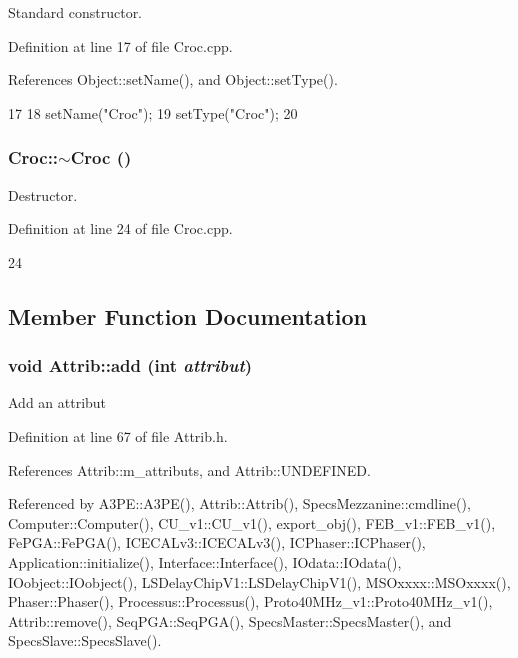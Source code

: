 Standard constructor. 

Definition at line 17 of file Croc.cpp.

References Object::setName(), and Object::setType().


\begin{DoxyCode}
17              {
18   setName("Croc");
19   setType("Croc");
20 }
\end{DoxyCode}
\hypertarget{classCroc_ace1e761410c9b53c1ff062a0dadcbd7b}{
\subsubsection[{$\sim$Croc}]{\setlength{\rightskip}{0pt plus 5cm}Croc::$\sim$Croc ()}}
\label{classCroc_ace1e761410c9b53c1ff062a0dadcbd7b}


Destructor. 

Definition at line 24 of file Croc.cpp.


\begin{DoxyCode}
24 {} 
\end{DoxyCode}


\subsection{Member Function Documentation}
\hypertarget{classAttrib_a235f773af19c900264a190b00a3b4ad7}{
\subsubsection[{add}]{\setlength{\rightskip}{0pt plus 5cm}void Attrib::add (int {\em attribut})}}
\label{classAttrib_a235f773af19c900264a190b00a3b4ad7}
Add an attribut 

Definition at line 67 of file Attrib.h.

References Attrib::m\_\-attributs, and Attrib::UNDEFINED.

Referenced by A3PE::A3PE(), Attrib::Attrib(), SpecsMezzanine::cmdline(), Computer::Computer(), CU\_\-v1::CU\_\-v1(), export\_\-obj(), FEB\_\-v1::FEB\_\-v1(), FePGA::FePGA(), ICECALv3::ICECALv3(), ICPhaser::ICPhaser(), Application::initialize(), Interface::Interface(), IOdata::IOdata(), IOobject::IOobject(), LSDelayChipV1::LSDelayChipV1(), MSOxxxx::MSOxxxx(), Phaser::Phaser(), Processus::Processus(), Proto40MHz\_\-v1::Proto40MHz\_\-v1(), Attrib::remove(), SeqPGA::SeqPGA(), SpecsMaster::SpecsMaster(), and SpecsSlave::SpecsSlave().



